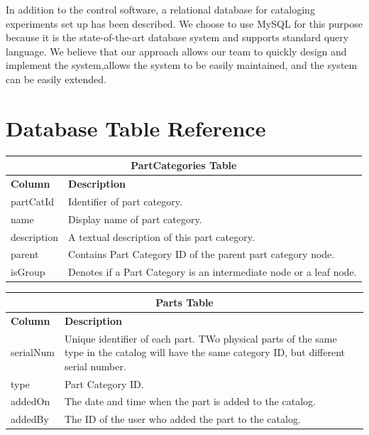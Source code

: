 In addition to the control software, a relational database for cataloging experiments set up has been described. We choose to use MySQL for this purpose because it is the state-of-the-art database system and supports standard query language. We believe that our approach allows our team to quickly design and implement the system,allows the system to be easily maintained, and the system can be easily extended.

\section{Database Table Reference}

\begin{table}[h!]
\centering
\begin{tabular}{l p{12cm}}
\multicolumn{2}{c}{\bf PartCategories Table} \\ \hline
{\bf Column} & {\bf Description}\\ \hline
partCatId & Identifier of part category.\\ \hline
name & Display name of part category.\\ \hline
description & A textual description of this part category. \\ \hline
parent & Contains Part Category ID of the parent part category node.\\ \hline
isGroup & Denotes if a Part Category is an intermediate node or a leaf node. \\ \hline
\end{tabular}
\end{table}

\begin{table}[h!]
\centering
\begin{tabular}{l p{12cm}}
\multicolumn{2}{c}{\bf Parts Table} \\ \hline
{\bf Column} & {\bf Description}\\ \hline
serialNum & Unique identifier of each part. TWo physical parts of the same type in the catalog will have the same category ID, but different serial number.\\ \hline
type & Part Category ID.\\ \hline
addedOn & The date and time when the part is added to the catalog. \\ \hline
addedBy & The ID of the user who added the part to the catalog.\\ \hline
\end{tabular}
\end{table}

